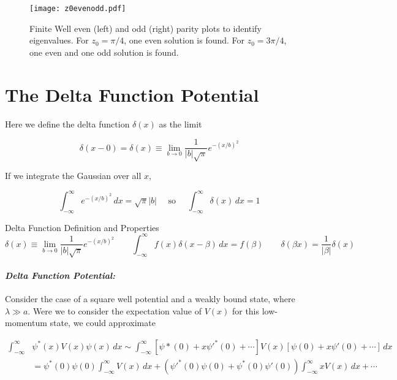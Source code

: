 \begin{figure}[H]
  \centering
    \texttt{[image: z0evenodd.pdf]}
    \caption{Finite Well even (left) and odd (right) parity plots to identify
    eigenvalues. For $z_0 = \pi /4$, one even solution is found. For $z_0 = 3\pi
  / 4$, one even and one odd solution is found.}
    \label{z0evenodd}
\end{figure}

\section{The Delta Function Potential} 

Here we define the delta function $\delta(x)$ as the limit 

\[
  \delta(x - 0) = \delta(x) \equiv \lim_{b\to 0}
  \frac{1}{|b|\sqrt{\pi}}e^{-(x/b)^2}
\] \vspace{3px}

If we integrate the Gaussian over all $x$, 

\[
  \int_{-\infty}^{\infty} e^{-(x/b)^2} \, dx = \sqrt{\pi}|b| \quad \text{ so
  } \quad \int_{-\infty}^{\infty} \delta(x) \, dx = 1
\] \vspace{3px}

\begin{mainbox}{Delta Function Definition and Properties}
  \[
    \delta(x) \equiv \lim_{b\to 0} \frac{1}{|b|\sqrt{\pi}}e^{-(x/b)^2} \qquad
    \int_{-\infty}^{\infty} f(x)\delta(x-\beta) \, dx = f(\beta) \qquad
    \delta(\beta x) = \frac{1}{|\beta|}\delta(x)
  \] \vspace{3px}  
\end{mainbox}

\paragraph{\textit{Delta Function Potential:}} Consider the case of a square
well potential and a weakly bound state, where $\lambda \gg a$. Were we to
consider the expectation value of $V(x)$ for this low-momentum state, we could
approximate

\begin{align}
  \int_{-\infty}^{\infty} &\psi^*(x) V(x) \psi(x) \, dx \sim
  \int_{-\infty}^{\infty} [\psi*(0) + x\psi'^*(0) + \cdots] V(x) [\psi(0)
  + x\psi'(0) + \cdots] \, dx \\
                          &= \psi^*(0)\psi(0) \int_{-\infty}^{\infty} V(x) \,
                          dx + (\psi'^*(0)\psi(0) + \psi^*(0)\psi'(0))
                          \int_{-\infty}^{\infty} xV(x) \, dx + \cdots 
\end{align}

